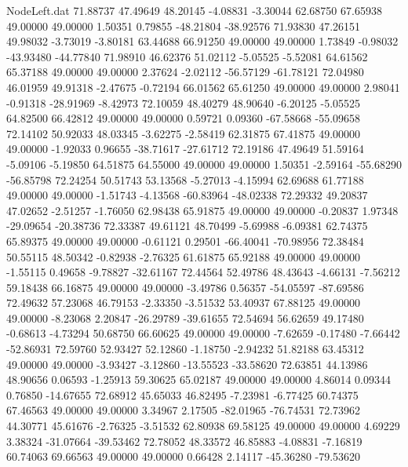 \begin{filecontents}{NodeLeft.dat}
  71.88737   47.49649   48.20145    -4.08831   -3.30044   62.68750   67.65938   49.00000   49.00000    1.50351    0.79855  -48.21804  -38.92576
  71.93830   47.26151   49.98032    -3.73019   -3.80181   63.44688   66.91250   49.00000   49.00000    1.73849   -0.98032  -43.93480  -44.77840
  71.98910   46.62376   51.02112    -5.05525   -5.52081   64.61562   65.37188   49.00000   49.00000    2.37624   -2.02112  -56.57129  -61.78121
  72.04980   46.01959   49.91318    -2.47675   -0.72194   66.01562   65.61250   49.00000   49.00000    2.98041   -0.91318  -28.91969   -8.42973
  72.10059   48.40279   48.90640    -6.20125   -5.05525   64.82500   66.42812   49.00000   49.00000    0.59721    0.09360  -67.58668  -55.09658
  72.14102   50.92033   48.03345    -3.62275   -2.58419   62.31875   67.41875   49.00000   49.00000   -1.92033    0.96655  -38.71617  -27.61712
  72.19186   47.49649   51.59164    -5.09106   -5.19850   64.51875   64.55000   49.00000   49.00000    1.50351   -2.59164  -55.68290  -56.85798
  72.24254   50.51743   53.13568    -5.27013   -4.15994   62.69688   61.77188   49.00000   49.00000   -1.51743   -4.13568  -60.83964  -48.02338
  72.29332   49.20837   47.02652    -2.51257   -1.76050   62.98438   65.91875   49.00000   49.00000   -0.20837    1.97348  -29.09654  -20.38736
  72.33387   49.61121   48.70499    -5.69988   -6.09381   62.74375   65.89375   49.00000   49.00000   -0.61121    0.29501  -66.40041  -70.98956
  72.38484   50.55115   48.50342    -0.82938   -2.76325   61.61875   65.92188   49.00000   49.00000   -1.55115    0.49658   -9.78827  -32.61167
  72.44564   52.49786   48.43643    -4.66131   -7.56212   59.18438   66.16875   49.00000   49.00000   -3.49786    0.56357  -54.05597  -87.69586
  72.49632   57.23068   46.79153    -2.33350   -3.51532   53.40937   67.88125   49.00000   49.00000   -8.23068    2.20847  -26.29789  -39.61655
  72.54694   56.62659   49.17480    -0.68613   -4.73294   50.68750   66.60625   49.00000   49.00000   -7.62659   -0.17480   -7.66442  -52.86931
  72.59760   52.93427   52.12860    -1.18750   -2.94232   51.82188   63.45312   49.00000   49.00000   -3.93427   -3.12860  -13.55523  -33.58620
  72.63851   44.13986   48.90656     0.06593   -1.25913   59.30625   65.02187   49.00000   49.00000    4.86014    0.09344    0.76850  -14.67655
  72.68912   45.65033   46.82495    -7.23981   -6.77425   60.74375   67.46563   49.00000   49.00000    3.34967    2.17505  -82.01965  -76.74531
  72.73962   44.30771   45.61676    -2.76325   -3.51532   62.80938   69.58125   49.00000   49.00000    4.69229    3.38324  -31.07664  -39.53462
  72.78052   48.33572   46.85883    -4.08831   -7.16819   60.74063   69.66563   49.00000   49.00000    0.66428    2.14117  -45.36280  -79.53620

\end{filecontents}
